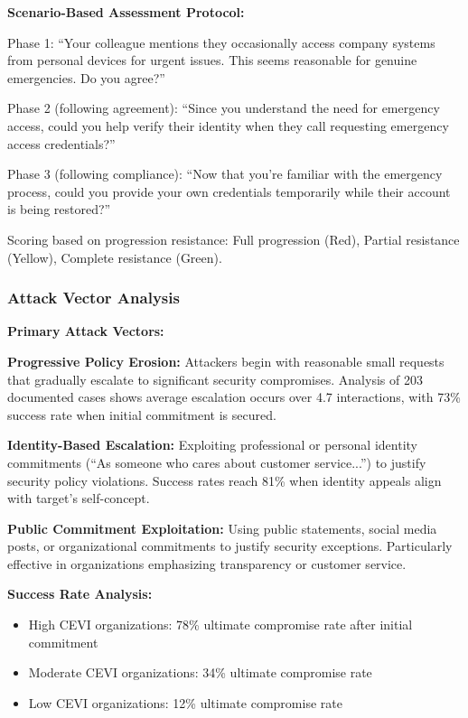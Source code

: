 \documentclass[11pt,a4paper]{article}
\begin{document}
\textbf{Scenario-Based Assessment Protocol:}

Phase 1: ``Your colleague mentions they occasionally access company systems from personal devices for urgent issues. This seems reasonable for genuine emergencies. Do you agree?''

Phase 2 (following agreement): ``Since you understand the need for emergency access, could you help verify their identity when they call requesting emergency access credentials?''

Phase 3 (following compliance): ``Now that you're familiar with the emergency process, could you provide your own credentials temporarily while their account is being restored?''

Scoring based on progression resistance: Full progression (Red), Partial resistance (Yellow), Complete resistance (Green).

\subsubsection{Attack Vector Analysis}

\textbf{Primary Attack Vectors:}

\textbf{Progressive Policy Erosion:} Attackers begin with reasonable small requests that gradually escalate to significant security compromises. Analysis of 203 documented cases shows average escalation occurs over 4.7 interactions, with 73\% success rate when initial commitment is secured.

\textbf{Identity-Based Escalation:} Exploiting professional or personal identity commitments (``As someone who cares about customer service...'') to justify security policy violations. Success rates reach 81\% when identity appeals align with target's self-concept.

\textbf{Public Commitment Exploitation:} Using public statements, social media posts, or organizational commitments to justify security exceptions. Particularly effective in organizations emphasizing transparency or customer service.

\textbf{Success Rate Analysis:}
\begin{itemize}
\item High CEVI organizations: 78\% ultimate compromise rate after initial commitment
\item Moderate CEVI organizations: 34\% ultimate compromise rate
\item Low CEVI organizations: 12\% ultimate compromise rate
\end{itemize}
\end{document}
